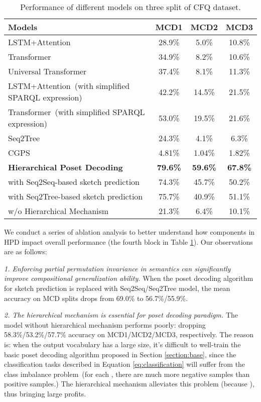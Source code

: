 \documentclass{article}
\begin{document}
\begin{table}[tbp]
\small
\caption{Performance of different models on three split of CFQ dataset.}
\centering
\begin{tabular}{lccc}
\toprule[1pt]
 Models & MCD1 & MCD2 & MCD3 \\
\midrule
LSTM+Attention~\citep{keysers2020measuring}  & 28.9\% & 5.0\% & 10.8\%  \\
Transformer~\citep{keysers2020measuring} & 34.9\% & 8.2\% & 10.6\% \\
Universal Transformer~\citep{keysers2020measuring} & 37.4\% & 8.1\% & 11.3\%\\
\midrule
LSTM+Attention~(with simplified SPARQL expression)  &42.2\%& 14.5\% & 21.5\%  \\
Transformer~(with simplified SPARQL expression) & 53.0\% &  19.5\% & 21.6\% \\
\midrule
Seq2Tree~\citep{dong-lapata-2016-language} & 24.3\% &  4.1\% & 6.3\%  \\
CGPS~\citep{li2019compositional} & 4.81\% & 1.04\% & 1.82\% \\
\midrule
\textbf{Hierarchical Poset Decoding} &\textbf{79.6\%} &  \textbf{59.6\%} & \textbf{67.8\%} \\
\qquad with Seq2Seq-based sketch prediction  & 74.3\%& 45.7\% & 50.2\%\\
\qquad with Seq2Tree-based sketch prediction  & 75.7\% & 40.9\% & 51.1\%\\
\qquad w/o Hierarchical Mechanism & 21.3\% &  6.4\% & 10.1\%\\
\bottomrule[1pt]
\end{tabular}
\label{tab:major_result}
\end{table}

We conduct a series of ablation analysis to better understand how components in HPD impact overall performance (the fourth block in Table \ref{tab:major_result}).
Our observations are as follows:

\emph{1. Enforcing partial permutation invariance in semantics can significantly improve compositional generalization ability.}
When the poset decoding algorithm for sketch prediction is replaced with Seq2Seq/Seq2Tree model, the mean accuracy on MCD splits drops from 69.0\% to 56.7\%/55.9\%.




\emph{2. The hierarchical mechanism is essential for poset decoding paradigm.}
The model without hierarchical mechanism performs poorly: dropping 58.3\%/53.2\%/57.7\% accuracy on MCD1/MCD2/MCD3, respectively.
The reason is: when the output vocabulary  has a large size, it's difficult to well-train the basic poset decoding algorithm proposed in Section \ref{section:base}, since the classification tasks described in Equation \ref{eq:classification} will suffer from the class imbalance problem~(for each , there are much more negative samples than positive samples.)
The hierarchical mechanism alleviates this problem (because ), thus bringing large profits.
\end{document}
